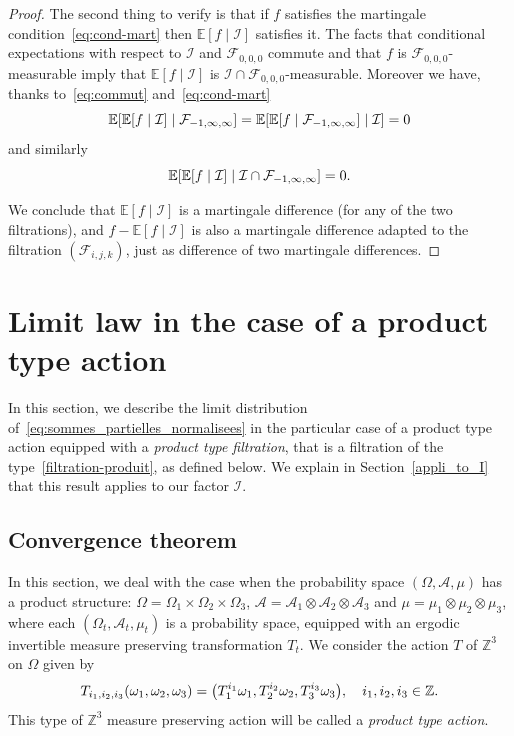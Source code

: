 \documentclass[10pt]{amsart}
\theoremstyle{definition}\newtheorem{defi}[theo]{Definition}\newtheorem{rema}[theo]{Remark}\newtheorem{exam}[theo]{Example}\newtheorem{exem}[theo]{Example}\newtheorem{nota}[theo]{Notation}
\newcommand{\Z}{\mathbb{Z}}
\newcommand{\bbE}{\mathbb{E}}
\newcommand{\E}[1]{\bbE\left[#1\right]}
\newcommand*\I{\mathcal{I}}
\newcommand*\F{\mathcal{F}}
\newcommand{\Aca}{\mathcal{A}}
\newcommand{\pr}[1]{\left(#1\right)}
\let\originalleft\left
\let\originalright\right
\renewcommand{\left}{\mathopen{}\mathclose\bgroup\originalleft}
\renewcommand{\right}{\aftergroup\egroup\originalright}
\begin{document}
\begin{proof}
The second thing to verify is that if $f$ satisfies the martingale condition~\eqref{eq:cond-mart} then $\bbE[f\mid\I]$ satisfies it. The facts that conditional expectations with respect to $\I$ and $\F_{0,0,0}$ commute and that $f$ is $\F_{0,0,0}$-measurable imply that $\bbE[f\mid\I]$ is $\I\cap\F_{0,0,0}$-measurable. Moreover we have, thanks to~\eqref{eq:commut} and~\eqref{eq:cond-mart}
\[
\E{\E{f\mid\I}\mid\F_{-1,\infty,\infty}}=\E{\E{f\mid\F_{-1,\infty,\infty}}\mid\I}=0
\]
and similarly
\[
\E{\E{f\mid\I}\mid\I\cap\F_{-1,\infty,\infty}}=0.
\]

We conclude that $\bbE[f\mid\I]$ is a martingale difference (for any of the two filtrations), and $f-\bbE[f\mid\I]$ is also a martingale difference adapted to the filtration $(\F_{i,j,k})$, just as difference of two martingale differences.
\end{proof}


\section{Limit law in the case of a product type action}\label{product-type CLT}

In this section, we describe the limit distribution of~\eqref{eq:sommes_partielles_normalisees} in the particular case of a product type action equipped with a \emph{product type filtration}, that is a filtration of the type~\eqref{filtration-produit}, as defined below. We explain in Section~\ref{appli_to_I} that this result applies to our factor $\I$.

\subsection{Convergence theorem}

In this section, we deal with the case when {the probability space $(\Omega,\Aca,\mu)$ has a product structure: $\Omega=\Omega_1\times\Omega_2\times\Omega_3$, $\Aca=\Aca_1\otimes\Aca_2\otimes\Aca_3$ and $\mu=\mu_1\otimes\mu_2\otimes\mu_3$, where each $(\Omega_t,\Aca_t,\mu_t)$ is a probability space, equipped with an ergodic invertible measure preserving transformation $T_t$. We consider the action $T$ of $\Z^3$ on $\Omega$ given by
\begin{equation*}
T_{i_1,i_2,i_3}\pr{\omega_1,\omega_2,\omega_3}=
\pr{T_1^{i_1}\omega_1,T_2^{i_2}\omega_2,T_3^{i_3}\omega_3},\quad i_1,i_2,i_3\in\Z.
\end{equation*}
This type of $\Z^3$ measure preserving action will be called a \emph{product type action}.}
\end{document}
